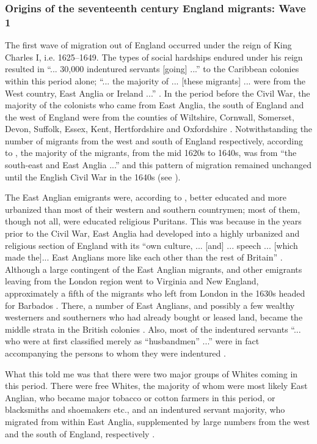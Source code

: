 \subsubsection{Origins of the seventeenth century England migrants: Wave 1}\label{6.2.1.1}
The first wave of migration out of England occurred under the reign of King Charles I, i.e. 1625--1649. The types of social hardships endured under his reign resulted in ``... 30,000 indentured servants [going] ...'' to the Caribbean colonies within this period alone; ``... the majority of ... [these migrants] ... were from the West country, East Anglia or Ireland ...'' \citep[25--26]{Parker11}. In the period before the Civil War, the majority of the colonists who came from East Anglia, the south of England and the west of England were from the counties of Wiltshire, Cornwall, Somerset, Devon, Suffolk, Essex, Kent, Hertfordshire and Oxfordshire \citep{Watts90, Kennedy09}. Notwithstanding the number of migrants from the west and south of England respectively, according to \citet[137]{Currer82}, the majority of the migrants, from the mid 1620s to 1640s, was from ``the south-east and East Anglia ...'' and this pattern of migration remained unchanged until the English Civil War in the 1640s (see ).

The East Anglian emigrants were, according to \citet{Collins99}, better educated and more urbanized than most of their western and southern countrymen; most of them, though not all, were educated religious Puritans. This was because in the years prior to the Civil War, East Anglia had developed into a highly urbanized and religious section of England with its ``own culture, ... [and] ... speech ... [which made the]... East Anglians more like each other than the rest of Britain'' \citep[18]{Collins99}. Although a large contingent of the East Anglian migrants, and other emigrants leaving from the London region went to Virginia and New England, approximately a fifth of the migrants who left from London in the 1630s headed for Barbados \citep{Parker11}. There, a number of East Anglians, and possibly a few wealthy westerners and southerners who had already bought or leased land, became the middle strata in the British colonies \citet{Collins99}. Also, most of the indentured servants ``... who were at first classified merely as ``husbandmen'' ...'' were in fact accompanying the persons to whom they were indentured \citep[150]{Watts90}.

What this told me was that there were two major groups of Whites coming in this period. There were free Whites, the majority of whom were most likely East Anglian, who became major tobacco or cotton farmers in this period, or blacksmiths and shoemakers etc., and an indentured servant majority, who migrated from within East Anglia, supplemented by large numbers from the west and the south of England, respectively \citep{Watts90, Parker11}.

